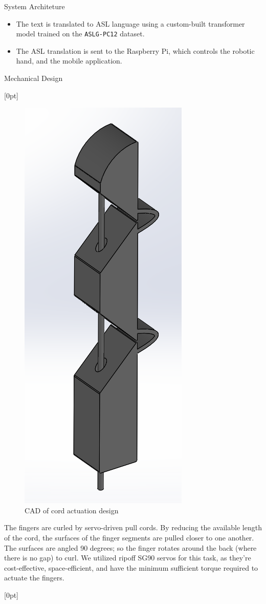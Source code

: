 \documentclass[final, 20pt]{beamer}
\newlength{\colwidth}
\newlength{\twocolwidth}
\begin{document}
\begin{frame}[t]
\begin{columns}[t]
\begin{column}{\twocolwidth}
\begin{block}{System Architeture}
\begin{minipage}{0.48\linewidth}
\begin{itemize}
            \item The text is translated to ASL language using a custom-built transformer model trained on the \texttt{ASLG-PC12} dataset.
            \item The ASL translation is sent to the Raspberry Pi, which controls the robotic hand, and the mobile application.
          \end{itemize}
        \end{minipage}
      \end{block}

      \begin{block}{Mechanical Design}
        \begin{minipage}[t]{0.48\linewidth}
          [0pt]

          \begin{figure}
            \centering
            \includegraphics[width=0.35\linewidth]{images/finger.png}
            \caption{CAD of cord actuation design}
            \label{fig:cord-actuation}
          \end{figure}

          The fingers are curled by servo-driven pull cords. By reducing the available length of the cord, the surfaces of the finger segments are pulled closer to one another. The surfaces are angled 90 degrees; so the finger rotates around the back (where there is no gap) to curl. We utilized ripoff SG90 servos for this task, as they're cost-effective, space-efficient, and have the minimum sufficient torque required to actuate the fingers.
        \end{minipage}\hfill%
        \begin{minipage}[t]{0.48\linewidth}
          [0pt]


\end{minipage}
\end{block}
\end{column}
\end{columns}
\end{frame}
\end{document}
